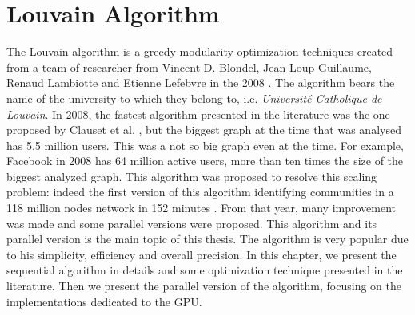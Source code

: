 
\section{Louvain Algorithm}
The Louvain algorithm is a greedy modularity optimization techniques created from a team of researcher from Vincent D. Blondel, Jean-Loup Guillaume, Renaud Lambiotte and Etienne Lefebvre in the 2008 \cite{Blondel_2008}. The algorithm bears the name of the university to which they belong to, i.e. \textit{Université Catholique de Louvain}.
In 2008, the fastest algorithm presented in the literature was the one proposed by Clauset et al. \cite{Clauset_2004}, but the biggest graph at the time that was analysed has 5.5 million users. This was a not so big graph even at the time. For example, Facebook in 2008 has 64 million active users, more than ten times the size of the biggest analyzed graph. This algorithm was proposed to resolve this scaling problem:  indeed the first version of this algorithm identifying communities in a 118 million nodes network in 152 minutes \cite{Blondel_2008}. From that year, many improvement was made and some parallel versions were proposed. 
This algorithm and its parallel version is the main topic of this thesis. The algorithm is very popular due to his simplicity, efficiency and overall precision.
In this chapter, we present the sequential algorithm in details and some optimization technique presented in the literature.
Then we present the parallel version of the algorithm, focusing on the implementations dedicated to the GPU.
